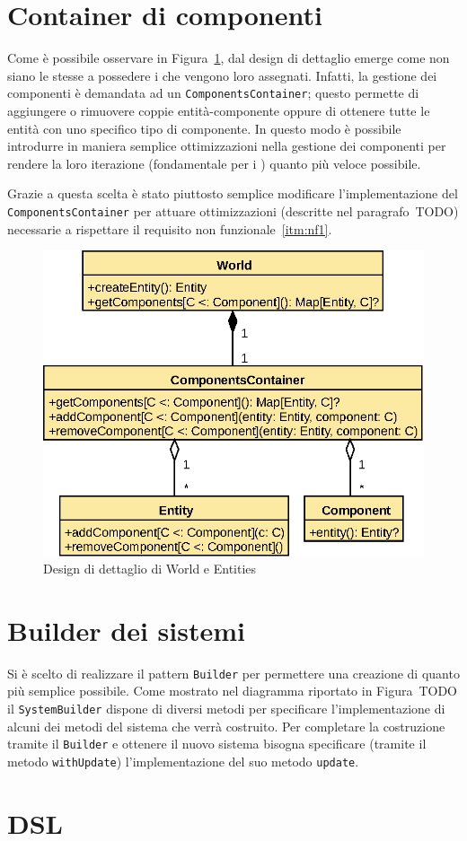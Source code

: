 

\section{Container di componenti}\label{sec:container-di-componenti}
Come è possibile osservare in Figura~\ref{fig:world-detail}, dal design di dettaglio emerge come
non siano le \Entity stesse a possedere i \Component che vengono loro assegnati.
Infatti, la gestione dei componenti è demandata ad un \texttt{ComponentsContainer}; questo permette
di aggiungere o rimuovere coppie entità-componente oppure di ottenere tutte le entità con uno specifico tipo
di componente.
In questo modo è possibile introdurre in maniera semplice ottimizzazioni nella gestione dei
componenti per rendere la loro iterazione (fondamentale per i \System) quanto più veloce possibile.

Grazie a questa scelta è stato piuttosto semplice modificare l'implementazione del
\texttt{ComponentsContainer} per attuare ottimizzazioni (descritte nel paragrafo~TODO)
necessarie a rispettare il requisito non funzionale~\ref{itm:nf1}.
\begin{figure}
    \includegraphics{./img/WorldDetail}
    \caption{Design di dettaglio di World e Entities}
    \label{fig:world-detail}
\end{figure}

\section{Builder dei sistemi}\label{sec:builder-dei-sistemi}
Si è scelto di realizzare il pattern \texttt{Builder} per permettere una creazione di \System
quanto più semplice possibile.
Come mostrato nel diagramma riportato in Figura~TODO il \texttt{SystemBuilder} dispone di diversi metodi per
specificare l'implementazione di alcuni dei metodi del sistema che verrà costruito.
Per completare la costruzione tramite il \texttt{Builder} e ottenere il nuovo sistema bisogna specificare
(tramite il metodo \texttt{withUpdate}) l'implementazione del suo metodo \texttt{update}.

\section{DSL}\label{sec:dsl}
